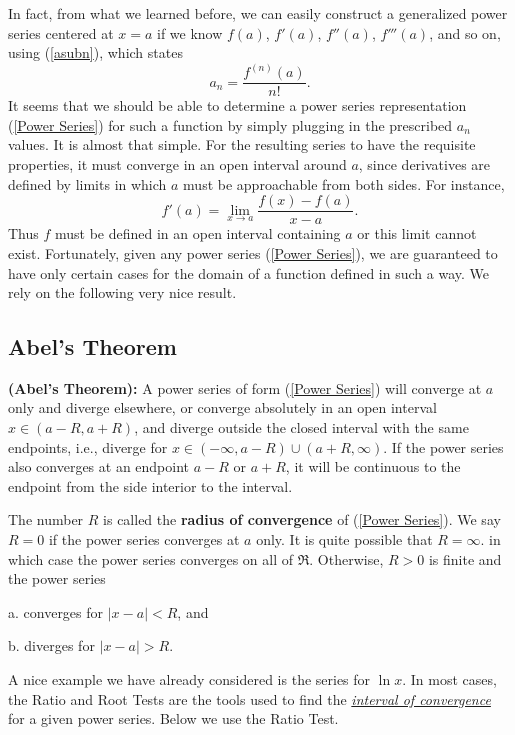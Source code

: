 In fact, from what we learned before, we can easily construct a
generalized power series centered at $x=a$ if we know
$f(a)$, $f'(a)$, $f''(a)$, $f'''(a)$, and so on, using
(\ref{asubn}), which states 
$$a_n=\frac{f^{(n)}(a)}{n!}.$$
It seems that we should be able to determine a power series
representation (\ref{Power Series}) for such a function
by simply plugging in the prescribed $a_n$ values.  
It is almost that simple.  For the resulting series to 
have the requisite properties, it must converge in an open
interval around $a$, since derivatives are defined by limits
in which $a$ must be approachable from both sides.
For instance, 
$$f'(a)=\lim_{x\to a}\frac{f(x)-f(a)}{x-a}.$$
Thus $f$ must be defined in an open interval containing $a$
or this limit cannot exist.  Fortunately, given any power
series (\ref{Power Series}), we are guaranteed to have 
only certain cases for the domain of a function defined
in such a way.  We rely on the following very nice result. 

\subsection{Abel's Theorem} 
\begin{theorem}
{\bf (Abel's Theorem):}
A power series of form (\ref{Power Series}) will converge 
at $a$ only and diverge elsewhere, or converge absolutely in an open 
interval $x\in(a-R,a+R)$, and diverge outside the closed
interval with the same endpoints, i.e., diverge for 
$x\in(-\infty,a-R)\cup(a+R,\infty)$.  If the power series also converges 
at an endpoint $a-R$ or $a+R$, it will be continuous to the endpoint
from the side interior to the interval. 
\label{Abel's}\end{theorem}



\begin{definition}
The number $R$ is called the {\bf radius of convergence} of 
(\ref{Power Series}).  We say $R=0$ if the power series converges
at $a$ only. It is quite possible that $R=\infty$.
in which case the power series  converges on all of $\Re$.
Otherwise, $R>0$ is finite and the  power series 
\begin{description}
\item a. converges for $|x-a|<R$, and
\item b. diverges for $|x-a|>R$.\end{description}
\end{definition}

A nice example we have already considered is the series for 
$\ln x$.  
In most cases, the Ratio and Root Tests are the tools used to find the 
\underline{\it interval of convergence} for a given power series.  Below we
use the Ratio Test. 

